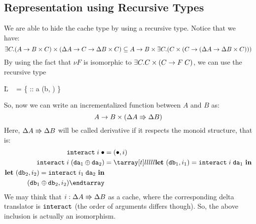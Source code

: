\documentclass{article}
\theoremstyle{definition}
\begin{document}

\subsection{Representation using Recursive Types}

We are able to hide the cache type by using a recursive type.
Notice that we have:
\[
  \exists C. (A \to B \times C) \times (\Delta A \to C \to \Delta B \times C)
  \subseteq 
   A \to B \times \exists C. (C \times (C \to (\Delta A \to \Delta B \times C)))
\]
By using the fact that $\nu F$ is isomorphic to $\exists C. C \times (C \to F \; C)$, we can use the recursive type 
\begin{code}
\=L ~ = \A \{  :: a \to (b, ) \}
\end{code}
So, now we can write an incrementalized function between $A$ and $B$ as: 
\[
  A \to B \times (\Delta A \Rrightarrow \Delta B)
\]
Here, $\Delta A \Rrightarrow \Delta B$ will be called derivative if it respects the monoid structure, that is: 
\begin{align*}
 \var{interact} \A i \A \NilChange &= (\NilChange, i) \\
 \var{interact} \A i \A (\var{da}_1 \oplus \var{da}_2) &= 
  \bbt \LET~(\var{db}_1,i_1) = \var{interact} \A i \A \var{da}_1~\IN\\
       \LET~(\var{db}_2,i_2) = \var{interact} \A i_1 \A \var{da}_2~\IN\\
       \quad (\var{db}_1 \oplus \var{db}_2, i_2) 
  \ee  
\end{align*}
We may think that $i : \Delta A \Rrightarrow \Delta B$ as a cache, where the corresponding delta translator is $\texttt{interact}$ (the order of arguments differs though). 
So, the above inclusion is actually an isomorphism. 
\end{document}
